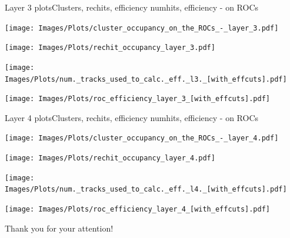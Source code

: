 \documentclass{beamer}
\begin{document}
\begin{frame}{Layer 3 plots}{Clusters, rechits, efficiency numhits, efficiency - on ROCs}
  \hspace{0.01\textwidth}%
  \begin{minipage}{0.45\textwidth}
    \centering
    \texttt{[image: Images/Plots/cluster\_occupancy\_on\_the\_ROCs\_-\_layer\_3.pdf]}
  \end{minipage}%
  \hspace{0.01\textwidth}%
  \begin{minipage}{0.45\textwidth}
    \centering
    \texttt{[image: Images/Plots/rechit\_occupancy\_layer\_3.pdf]}
  \end{minipage}
  \vspace*{0.2cm}
  \begin{minipage}{0.45\textwidth}
    \centering
    \texttt{[image: Images/Plots/num.\_tracks\_used\_to\_calc.\_eff.\_l3.\_[with\_effcuts].pdf]}
  \end{minipage}%
  \hspace{0.01\textwidth}%
  \begin{minipage}{0.45\textwidth}
    \centering
    \texttt{[image: Images/Plots/roc\_efficiency\_layer\_3\_[with\_effcuts].pdf]}
  \end{minipage}
\end{frame}

\begin{frame}{Layer 4 plots}{Clusters, rechits, efficiency numhits, efficiency - on ROCs}
  \hspace{0.01\textwidth}%
  \begin{minipage}{0.45\textwidth}
    \centering
    \texttt{[image: Images/Plots/cluster\_occupancy\_on\_the\_ROCs\_-\_layer\_4.pdf]}
  \end{minipage}%
  \hspace{0.01\textwidth}%
  \begin{minipage}{0.45\textwidth}
    \centering
    \texttt{[image: Images/Plots/rechit\_occupancy\_layer\_4.pdf]}
  \end{minipage}
  \vspace*{0.2cm}
  \begin{minipage}{0.45\textwidth}
    \centering
    \texttt{[image: Images/Plots/num.\_tracks\_used\_to\_calc.\_eff.\_l4.\_[with\_effcuts].pdf]}
  \end{minipage}%
  \hspace{0.01\textwidth}%
  \begin{minipage}{0.45\textwidth}
    \centering
    \texttt{[image: Images/Plots/roc\_efficiency\_layer\_4\_[with\_effcuts].pdf]}
  \end{minipage}
\end{frame}

\begin{frame}{}
    \vspace*{1.6cm}
    \hspace*{0.55cm}\huge Thank you for your attention!
\end{frame}

 
\end{document}

